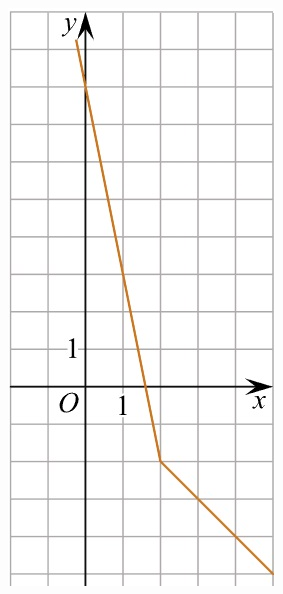 \begin{class}[number=5]
\begin{listofex}
\begin{minipage}[c]{0.1\textwidth}
			\includegraphics[align=t, width=\textwidth]{pics/G111M4C5-4.jpg}

\end{minipage}
\end{listofex}
\end{class}
